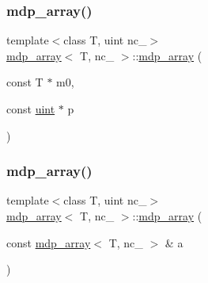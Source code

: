 \mbox{\label{classmdp__array_a1932c8ea14f2fc8cb7343f9834154521}} 
\subsubsection{\texorpdfstring{mdp\+\_\+array()}{mdp\_array()}\hspace{0.1cm}{\footnotesize\ttfamily [4/5]}}
{\footnotesize\ttfamily template$<$class T, uint nc\+\_\+$>$ \\
\hyperlink{classmdp__array}{mdp\+\_\+array}$<$ T, nc\+\_\+ $>$\+::\hyperlink{classmdp__array}{mdp\+\_\+array} (\begin{DoxyParamCaption}\item[{const T $\ast$}]{m0,  }\item[{const \hyperlink{mdp__global__vars_8h_a91ad9478d81a7aaf2593e8d9c3d06a14}{uint} $\ast$}]{p }\end{DoxyParamCaption})\hspace{0.3cm}{\ttfamily [inline]}}

\mbox{\label{classmdp__array_af266114d51b7b0e038cb555ba02d83d4}} 
\subsubsection{\texorpdfstring{mdp\+\_\+array()}{mdp\_array()}\hspace{0.1cm}{\footnotesize\ttfamily [5/5]}}
{\footnotesize\ttfamily template$<$class T, uint nc\+\_\+$>$ \\
\hyperlink{classmdp__array}{mdp\+\_\+array}$<$ T, nc\+\_\+ $>$\+::\hyperlink{classmdp__array}{mdp\+\_\+array} (\begin{DoxyParamCaption}\item[{const \hyperlink{classmdp__array}{mdp\+\_\+array}$<$ T, nc\+\_\+ $>$ \&}]{a }\end{DoxyParamCaption})\hspace{0.3cm}{\ttfamily [inline]}}

\mbox{\label{classmdp__array_a962dc25e9c53d9f6e215b0ef952fc96b}} 
